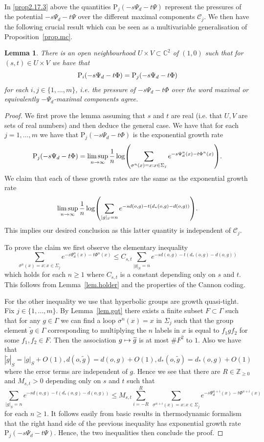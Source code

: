 \documentclass[10pt]{amsart}
\newtheorem{lemm}[theo]{Lemma}\newtheorem{prop}[theo]{Proposition}\newtheorem{coro}[theo]{Corollary}\newtheorem{conj}[theo]{Conjecture}
\theoremstyle{definition}\newtheorem{defi}[theo]{Definition}\newtheorem{rema}[theo]{Remark}\newtheorem{exam}[theo]{Example}\newtheorem{exem}[theo]{Example}\newtheorem{nota}[theo]{Notation}
\newcommand{\G}{\Gamma}
\renewcommand{\P}{\Psi}
\newcommand{\Cc}{\mathcal{C}}
\newcommand{\C}{\mathbb{C}}
\newcommand{\Z}{\mathbb{Z}}
\newcommand*\rmP{\mathrm{P}}
\let\originalleft\left
\let\originalright\right
\renewcommand{\left}{\mathopen{}\mathclose\bgroup\originalleft}
\renewcommand{\right}{\aftergroup\egroup\originalright}
\renewcommand*{\to}{\mathchoice{\longrightarrow}{\rightarrow}{\rightarrow}{\rightarrow}}
\let\oldmapsto\mapsto
\renewcommand*{\mapsto}{\mathchoice{\longmapsto}{\oldmapsto}{\oldmapsto}{\oldmapsto}}
\newcounter{setofcase}
\newcounter{case}[setofcase]
\theoremstyle{plain}
\begin{document}
In \eqref{prop2.17.3} above the quantities $\rmP_j(-s\P_d - t \Psi)$ represent the pressures of the potential $-s\P_d - t \Psi$ over the different maximal components $\Cc_j$. We then have the following crucial result which can be seen as a multivariable generalisation of Proposition~\ref{prop.mc}.

\begin{lemm}\label{lem.pressagree}
There is an open neighbourhood $U \times V \subset \C^2$ of $(1,0)$ such that for\ $(s,t) \in U \times V$ we have that
\[
\rmP_i\left(-s\Psi_d - t\Phi\right) = \rmP_j\left(-s\Psi_d - t\Phi\right)
\]
for each $i,j \in \{1,\dots, m\}$, i.e. the pressure of $-s\Psi_d - t\Phi$ over the word maximal or equivalently $-\P_d$-maximal components agree.
\end{lemm}

\begin{proof}
We first prove the lemma assuming that $s$ and $t$ are real (i.e. that $U,V$ are sets of real numbers) and then deduce the general case. We have that for each $j = 1,\dots, m$ we have that $\rmP_j(-s\Psi_d - t\Phi)$ is the exponential growth rate
\[
\rmP_j(-s\Psi_d - t\Phi) = \limsup_{n\to\infty} \frac{1}{n} \log \left(\sum_{\sigma^{n}(x) = x: x \in \Sigma_j} e^{-s\Psi^n_d(x) - t\Phi^n(x)}\right).
\]
We claim that each of these growth rates are the same as the exponential growth rate
\[
\limsup_{n\to\infty} \frac{1}{n} \log \left(\sum_{|g|_S = n} e^{-sd(o,g) - t(d_\ast(o,g) - d(o,g))}\right).
\]
This implies our desired conclusion as this latter quantity is independent of $\Cc_j$.

To prove the claim we first observe the elementary inequality
\[
\sum_{\sigma^{n}(x) = x : x \in \Sigma_j} e^{-s\Psi^n_d(x) - t\Phi^n(x)} \le C_{s,t} \sum_{|g|_S = n} e^{-sd(o,g) - t(d_\ast(o,g) - d(o,g))}
\]
which holds for each $n\ge 1$ where $C_{s,t}$ is a constant depending only on $s$ and $t$. This follows from Lemma~\ref{lem.holder} and the properties of the Cannon coding.

For the other inequality we use that hyperbolic groups are growth quasi-tight. Fix $j \in \{1,\dots,m\}$. By Lemma~\ref{lem.gqt} there exists a finite subset $F \subset \Gamma$ such that for any $g \in \Gamma$ we can find a loop $\sigma^n(x) = x$ in $\Sigma_j$ such that the group element $\widetilde{g} \in\G$ corresponding to multiplying the $n$ labels in $x$ is equal to $f_1gf_2$ for some $f_1, f_2 \in F$. Then the association $g \mapsto \widetilde{g}$ is at most $\# F^2$ to $1$. Also we have that $|\widetilde{g}|_S = |g|_S + O(1), d(o,\widetilde{g}) = d(o,g) + O(1), d_\ast(o,\widetilde{g}) = d_\ast(o,g) + O(1)$ where the error terms are independent of $g$. Hence we see that there are $R \in \Z_{\ge 0}$ and $M_{s,t} >0$ depending only on $s$ and $t$ such that
\[
\sum_{|g|_S = n} e^{-sd(o,g) - t(d_\ast(o,g) - d(o,g))} \le M_{s,t} \sum_{i= -R}^R\; \sum_{\sigma^{n+i}(x) = x : x \in \Sigma_j} e^{-s\Psi^{n+i}_d(x) - t\Phi^{n+i}(x)}
\]
for each $n \ge 1$. It follows easily from basic results in thermodynamic formalism that the right hand side of the previous inequality has exponential growth rate $\rmP_j(-s\P_d - t\Psi)$. Hence, the two inequalities then conclude the proof.


\end{proof}
\end{document}
